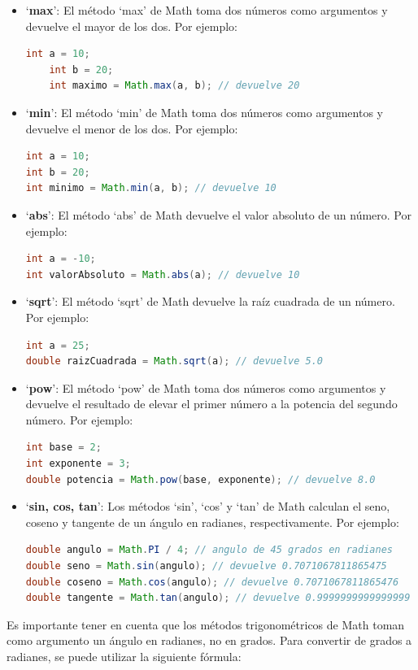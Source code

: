 \documentclass[executivepaper]{article}
\begin{document}
\begin{itemize}
    \item \enquote*{\textbf{max}}: El método \enquote*{max} de Math toma dos números como argumentos y devuelve el mayor de los dos. Por ejemplo:
    \begin{lstlisting}[language=Java]
    int a = 10;
    int b = 20;
    int maximo = Math.max(a, b); // devuelve 20
    \end{lstlisting}
    \item \enquote*{\textbf{min}}: El método \enquote*{min} de Math toma dos números como argumentos y devuelve el menor de los dos. Por ejemplo:
\begin{lstlisting}[language=Java]
int a = 10;
int b = 20;
int minimo = Math.min(a, b); // devuelve 10
\end{lstlisting}

\item \enquote*{\textbf{abs}}: El método \enquote*{abs} de Math devuelve el valor absoluto de un número. Por ejemplo:
\begin{lstlisting}[language=Java]
int a = -10;
int valorAbsoluto = Math.abs(a); // devuelve 10
\end{lstlisting}

\item \enquote*{\textbf{sqrt}}: El método \enquote*{sqrt} de Math devuelve la raíz cuadrada de un número. Por ejemplo:
\begin{lstlisting}[language=Java]
int a = 25;
double raizCuadrada = Math.sqrt(a); // devuelve 5.0
\end{lstlisting}

\item \enquote*{\textbf{pow}}: El método \enquote*{pow} de Math toma dos números como argumentos y devuelve el resultado de elevar el primer número a la potencia del segundo número. Por ejemplo:
\begin{lstlisting}[language=Java]
int base = 2;
int exponente = 3;
double potencia = Math.pow(base, exponente); // devuelve 8.0
\end{lstlisting}

\item \enquote*{\textbf{sin, cos, tan}}: Los métodos \enquote*{sin}, \enquote*{cos} y \enquote*{tan} de Math calculan el seno, coseno y tangente de un ángulo en radianes, respectivamente. Por ejemplo:
\begin{lstlisting}[language=Java]
double angulo = Math.PI / 4; // angulo de 45 grados en radianes
double seno = Math.sin(angulo); // devuelve 0.7071067811865475
double coseno = Math.cos(angulo); // devuelve 0.7071067811865476
double tangente = Math.tan(angulo); // devuelve 0.9999999999999999
\end{lstlisting}

\end{itemize}
Es importante tener en cuenta que los métodos trigonométricos de Math toman como argumento un ángulo en radianes, no en grados. Para convertir de grados a radianes, se puede utilizar la siguiente  fórmula:
\end{document}

